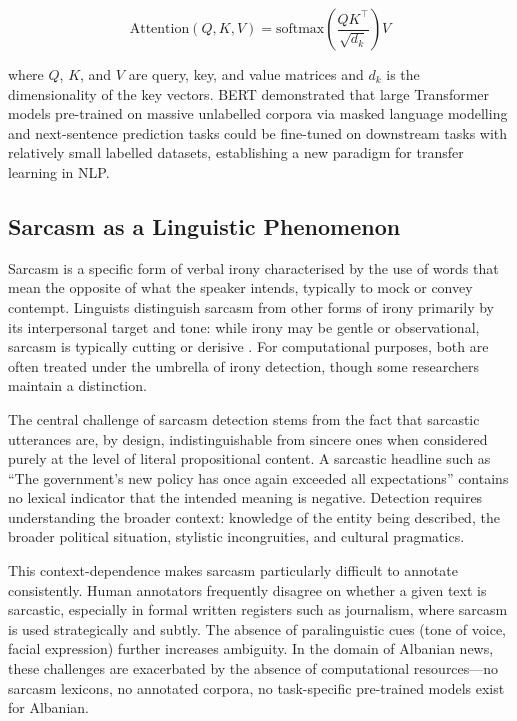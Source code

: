 \documentclass[12pt,a4paper]{article}
\begin{document}
\begin{equation}
    \text{Attention}(Q, K, V) = \text{softmax}\!\left(\frac{QK^\top}{\sqrt{d_k}}\right)V
    \label{eq:attention}
\end{equation}

where $Q$, $K$, and $V$ are query, key, and value matrices and $d_k$ is the dimensionality of the key vectors. BERT \citep{devlin2019bert} demonstrated that large Transformer models pre-trained on massive unlabelled corpora via masked language modelling and next-sentence prediction tasks could be fine-tuned on downstream tasks with relatively small labelled datasets, establishing a new paradigm for transfer learning in NLP.

\subsection{Sarcasm as a Linguistic Phenomenon}
\label{subsec:sarcasm_linguistics}

Sarcasm is a specific form of verbal irony characterised by the use of words that mean the opposite of what the speaker intends, typically to mock or convey contempt. Linguists distinguish sarcasm from other forms of irony primarily by its interpersonal target and tone: while irony may be gentle or observational, sarcasm is typically cutting or derisive \citep{riloff2013sarcasm}. For computational purposes, both are often treated under the umbrella of irony detection, though some researchers maintain a distinction.

The central challenge of sarcasm detection stems from the fact that sarcastic utterances are, by design, indistinguishable from sincere ones when considered purely at the level of literal propositional content. A sarcastic headline such as ``The government's new policy has once again exceeded all expectations'' contains no lexical indicator that the intended meaning is negative. Detection requires understanding the broader context: knowledge of the entity being described, the broader political situation, stylistic incongruities, and cultural pragmatics.

This context-dependence makes sarcasm particularly difficult to annotate consistently. Human annotators frequently disagree on whether a given text is sarcastic, especially in formal written registers such as journalism, where sarcasm is used strategically and subtly. The absence of paralinguistic cues (tone of voice, facial expression) further increases ambiguity. In the domain of Albanian news, these challenges are exacerbated by the absence of computational resources---no sarcasm lexicons, no annotated corpora, no task-specific pre-trained models exist for Albanian.
\end{document}
